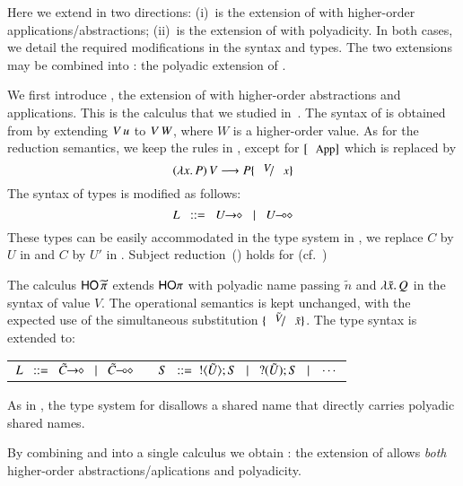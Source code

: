 



Here we extend \HOp in two directions: %
(i)~\HOpp is the extension of \HOp with higher-order applications/abstractions;
(ii)~\PHOp is the extension of \HOp
with polyadicity.
In both cases, we detail the
required modifications in the syntax and types.
The two extensions may be combined into \PHOpp: the polyadic extension of \HOpp.


We first introduce \HOpp, the  extension of \HOp with higher-order abstractions and applications.
This is the calculus that we studied in~\cite{characteristic_bis}. The syntax of \HOpp is obtained 
from   by extending
$V\, {u}$ to $V\, {W}$, where  $W$ is a higher-order value. 
As for the reduction semantics, we keep the rules in , except for 
 $\orule{App}$ which is replaced by 
\[
	\appl{(\abs{x}{P})}{V} \red P \subst{V}{x}
\]
The syntax of types is modified as follows: %
$$
		L \bnfis \shot{U} \bnfbar \lhot{U}
$$
These types can be easily accommodated in the type system in , 
we replace $C$ by $U$ in  and $C$ by $U'$ in . Subject
reduction~() holds for \HOpp (cf.~\cite{characteristic_bis})

%
The calculus  
$\mathsf{HO}\,{\widetilde{\pi}}$ 
extends $\mathsf{HO}\pi$ 
with polyadic name passing $\tilde{n}$ and $\lambda \tilde{x}.\,Q$ in the syntax 
of value $V$. 
The operational semantics is kept unchanged, with the expected use of the simultaneous substitution $\subst{\tilde{V}}{\tilde{x}}$.
The type syntax is extended to: 
%
\begin{center}
	\begin{tabular}{c}
	$	L \bnfis \shot{\tilde{C}} \bnfbar \lhot{\tilde{C}}
		\quad\quad
		S \bnfis  \btout{\tilde{U}} S \bnfbar \btinp{\tilde{U}} S \bnfbar \cdots$
	\end{tabular}
\end{center}
%
As in \cite{tlca07,MostrousY15},
the type system for \PHOp 
disallows a shared name that directly carries polyadic
shared names.

By combining \HOpp and \PHOp into a single calculus we obtain \PHOpp:
the extension of \HOp allows \emph{both} higher-order
abstractions/aplications and polyadicity.
